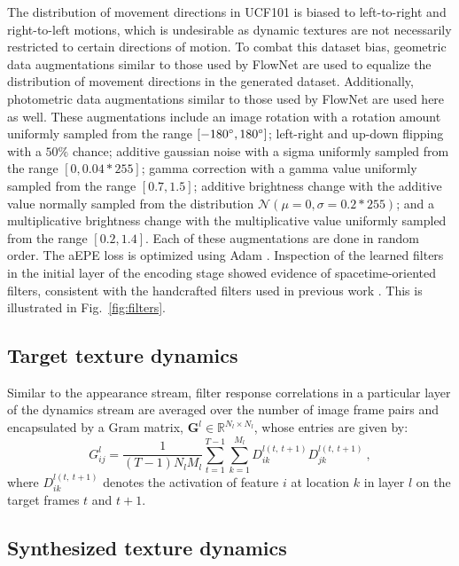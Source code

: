 The distribution of movement directions in UCF101 is biased to left-to-right and right-to-left motions, which is undesirable as dynamic textures are not necessarily restricted to certain directions of motion. To combat this dataset bias, geometric data augmentations similar to those used by FlowNet \cite{dosovitskiy2015} are used to equalize the distribution of movement directions in the generated dataset. Additionally, photometric data augmentations similar to those used by FlowNet \cite{dosovitskiy2015} are used here as well. These augmentations include an image rotation with a rotation amount uniformly sampled from the range $[-180 \degree , 180 \degree]$; left-right and up-down flipping with a $50\%$ chance; additive gaussian noise with a sigma uniformly sampled from the range $[0, 0.04*255]$; gamma correction with a gamma value uniformly sampled from the range $[0.7, 1.5]$; additive brightness change with the additive value normally sampled from the distribution $\mathcal{N}(\mu = 0, \sigma = 0.2*255)$; and a multiplicative brightness change with the multiplicative value uniformly sampled from the range $[0.2, 1.4]$. Each of these augmentations are done in random order.
The aEPE loss is optimized using Adam \cite{kingma2017}.
Inspection of the learned filters in the initial layer of the encoding stage
showed evidence of spacetime-oriented filters, consistent with
the handcrafted filters used in previous work \cite{derpanis2012spacetime}. This is illustrated in Fig.\ \ref{fig:filters}.



\subsection{Target texture dynamics}

Similar to the appearance stream, filter response correlations
in a particular layer of the dynamics
stream are averaged over the number of image frame
pairs and encapsulated by a Gram matrix,
$\mathbf{G}^{l} \in \mathbb{R}^{N_l \times N_l}$,
whose entries are given by:
\begin{equation}
	G_{ij}^l = \frac{1}{(T-1) N_l M_l} \sum_{t=1}^{T-1} \sum_{k=1}^{M_l} D_{ik}^{l(t,\ t+1)} D_{jk}^{l(t,\ t+1)}\ ,	
\end{equation}
where $D_{ik}^{l(t,\ t+1)}$ denotes the activation of feature $i$ at
location $k$ in layer $l$ on the target frames $t$ and $t+1$.

\subsection{Synthesized texture dynamics}

